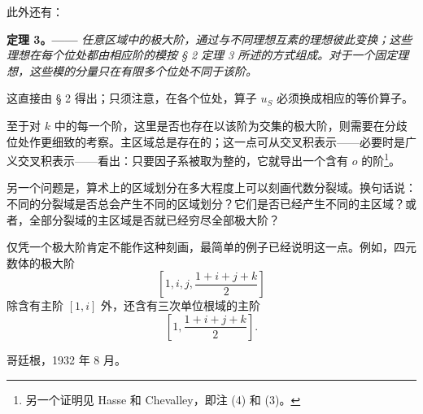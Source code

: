 \documentclass[11pt]{article}
\begin{document}
此外还有：

\medskip
\noindent\textbf{定理 3。——} \emph{任意区域中的极大阶，通过与不同理想互素的理想彼此变换；这些理想在每个位处都由相应阶的模按 § 2 定理 3 所述的方式组成。对于一个固定理想，这些模的分量只在有限多个位处不同于该阶。}

这直接由 § 2 得出；只须注意，在各个位处，算子 \(u_S\) 必须换成相应的等价算子。

至于对 \(k\) 中的每一个阶，这里是否也存在以该阶为交集的极大阶，则需要在分歧位处作更细致的考察。主区域总是存在的；这一点可从交叉积表示——必要时是广义交叉积表示——看出：只要因子系被取为整的，它就导出一个含有 \(o\) 的阶\footnote{另一个证明见 Hasse 和 Chevalley，即注 (4) 和 (3)。}。

另一个问题是，算术上的区域划分在多大程度上可以刻画代数分裂域。换句话说：不同的分裂域是否总会产生不同的区域划分？它们是否已经产生不同的主区域？或者，全部分裂域的主区域是否就已经穷尽全部极大阶？

仅凭一个极大阶肯定不能作这种刻画，最简单的例子已经说明这一点。例如，四元数体的极大阶
\[
\left[1,i,j,\frac{1+i+j+k}{2}\right]
\]
除含有主阶 \([1,i]\) 外，还含有三次单位根域的主阶
\[
\left[1,\frac{1+i+j+k}{2}\right].
\]

\begin{flushleft}
哥廷根，1932 年 8 月。
\end{flushleft}
\end{document}
